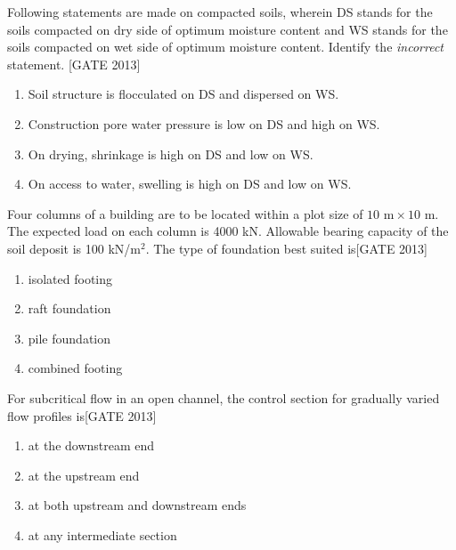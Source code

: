 \iffalse
\title{2013-CE}
\author{EE24BTECH11020 -  Ellanti Rohith}
\section{ce}
\chapter{2011}
\fi

    \item Following statements are made on compacted soils, wherein DS stands for the soils compacted on dry side of optimum moisture content and WS stands for the soils compacted on wet side of optimum moisture content. Identify the \textit{incorrect} statement. \hfill{[GATE 2013]}
    \begin{enumerate}
        \item Soil structure is flocculated on DS and dispersed on WS.
        \item Construction pore water pressure is low on DS and high on WS.
        \item On drying, shrinkage is high on DS and low on WS.
        \item On access to water, swelling is high on DS and low on WS.\\
    \end{enumerate}

    
      
    \item Four columns of a building are to be located within a plot size of $10  \text{ m} \times 10  \text{ m}$. The expected load on each column is 4000 kN. Allowable bearing capacity of the soil deposit is 100 kN/m$^2$. The type of foundation best suited is\hfill{[GATE 2013]}
    \begin{multicols}{2}
    \begin{enumerate}
        \item isolated footing
        \item raft foundation
        \item pile foundation
        \item combined footing
    \end{enumerate}
    \end{multicols}

    \item For subcritical flow in an open channel, the control section for gradually varied flow profiles is\hfill{[GATE 2013]}
    
    \begin{multicols}{2}
    \begin{enumerate}
        \item at the downstream end
        \item at the upstream end
        \item at both upstream and downstream ends
        \item at any intermediate section
    \end{enumerate}
    \end{multicols}

